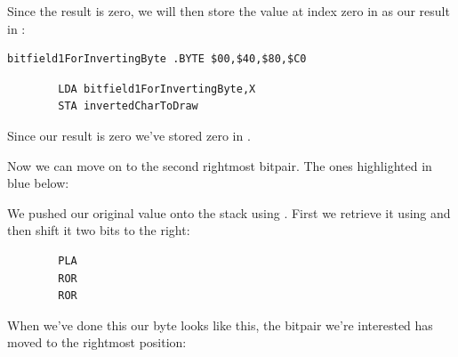 Since the result is zero, we will then store the value at index zero in 
as our result in :

\begin{lstlisting}
bitfield1ForInvertingByte .BYTE $00,$40,$80,$C0
\end{lstlisting}
\begin{lstlisting}
        LDA bitfield1ForInvertingByte,X
        STA invertedCharToDraw
\end{lstlisting}

Since our result is zero we've stored zero in .

Now we can move on to the second rightmost bitpair. The ones highlighted in blue below:

\begin{figure}[H]
  {
    \setlength{\tabcolsep}{3.0pt}
    \setlength\cmidrulewidth{\lightrulewidth} %
    \begin{adjustbox}{width=4cm,center}
    \end{adjustbox}
  }
\end{figure}

We pushed our original value onto the stack using . First we retrieve it using 
and then shift it two bits to the right:

\begin{lstlisting}
        PLA
        ROR
        ROR
\end{lstlisting}

When we've done this our byte looks like this, the bitpair we're interested has moved to the rightmost
position:

